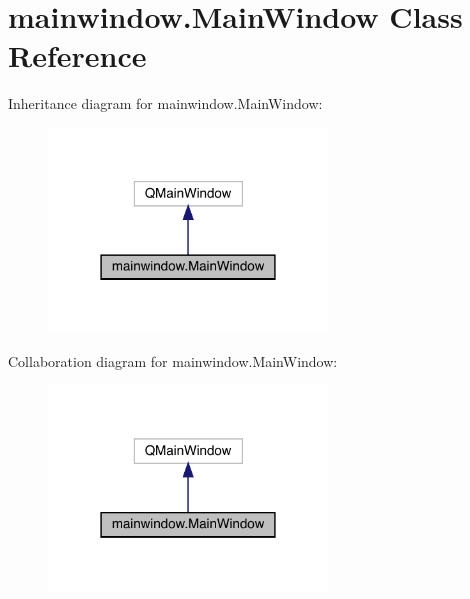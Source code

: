 \hypertarget{classmainwindow_1_1_main_window}{}\section{mainwindow.\+Main\+Window Class Reference}
\label{classmainwindow_1_1_main_window}


Inheritance diagram for mainwindow.\+Main\+Window\+:\nopagebreak
\begin{figure}[H]
\begin{center}
\leavevmode
\includegraphics[width=210pt]{classmainwindow_1_1_main_window__inherit__graph}
\end{center}
\end{figure}


Collaboration diagram for mainwindow.\+Main\+Window\+:\nopagebreak
\begin{figure}[H]
\begin{center}
\leavevmode
\includegraphics[width=210pt]{classmainwindow_1_1_main_window__coll__graph}
\end{center}
\end{figure}
